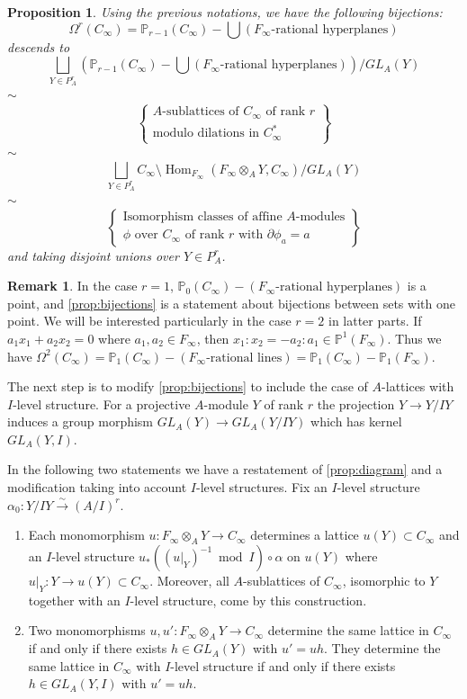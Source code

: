 \documentclass[12pt,a4paper]{article}
\theoremstyle{plain}
\newtheorem{proposition}{Proposition}[section]
\theoremstyle{definition}
\newtheorem{remark}{Remark}[section]
\theoremstyle{remark}
\DeclareMathOperator{\Hom}{Hom}
\newcommand{\bP}{\mathbb{P}}
\providecommand{\Hom}{\operatorname{Hom}}
\begin{document}
\begin{proposition}
\label{prop:bijections}
Using the previous notations, we have the following bijections:
\[
\Omega^r(C_\infty) = \bP_{r-1}(C_\infty) - \bigcup (F_\infty\text{-rational hyperplanes})
\]
descends to
\[
\bigsqcup_{Y \in P_A^r} (\bP_{r-1}(C_\infty) - \bigcup (F_\infty\text{-rational hyperplanes}))/GL_A(Y)
\]
$\sim$
\[
\left\{\begin{array}{c}
A\text{-sublattices of } C_\infty \text{ of rank } r \\
\text{modulo dilations in } C_\infty^*
\end{array}\right\}
\]
$\sim$
\[
\bigsqcup_{Y \in P_A^r} C_\infty \setminus \Hom_{F_\infty}(F_\infty \otimes_A Y, C_\infty)/GL_A(Y)
\]
$\sim$
\[
\left\{\begin{array}{c}
\text{Isomorphism classes of affine } A\text{-modules} \\
\phi \text{ over } C_\infty \text{ of rank } r \text{ with } \partial \phi_a = a
\end{array}\right\}
\]
and taking disjoint unions over $Y \in P_A^r$.
\end{proposition}

\begin{remark}
\label{rem:r=1}
In the case $r = 1$, $\bP_0(C_\infty) - (F_\infty\text{-rational hyperplanes})$ is a point, and \eqref{prop:bijections} is a statement about bijections between sets with one point. We will be interested particularly in the case $r = 2$ in latter parts. If $a_1 x_1 + a_2 x_2 = 0$ where $a_1, a_2 \in F_\infty$, then $x_1 : x_2 = -a_2 : a_1 \in \bP^1(F_\infty)$. Thus we have $\Omega^2(C_\infty) = \bP_1(C_\infty) - (F_\infty\text{-rational lines}) = \bP_1(C_\infty) - \bP_1(F_\infty)$.
\end{remark}

The next step is to modify \eqref{prop:bijections} to include the case of $A$-lattices with $I$-level structure. For a projective $A$-module $Y$ of rank $r$ the projection $Y \to Y/IY$ induces a group morphism $GL_A(Y) \to GL_A(Y/IY)$ which has kernel $GL_A(Y, I)$.

In the following two statements we have a restatement of \eqref{prop:diagram} and a modification taking into account $I$-level structures. Fix an $I$-level structure $\alpha_0: Y/IY \xrightarrow{\sim} (A/I)^r$.

\begin{enumerate}[label=(\arabic*)]
\item Each monomorphism $u: F_\infty \otimes_A Y \to C_\infty$ determines a lattice $u(Y) \subset C_\infty$ and an $I$-level structure $u_*( (u|_Y)^{-1} \bmod I) \circ \alpha$ on $u(Y)$ where $u|_Y: Y \to u(Y) \subset C_\infty$. Moreover, all $A$-sublattices of $C_\infty$, isomorphic to $Y$ together with an $I$-level structure, come by this construction.
\item Two monomorphisms $u, u': F_\infty \otimes_A Y \to C_\infty$ determine the same lattice in $C_\infty$ if and only if there exists $h \in GL_A(Y)$ with $u' = uh$. They determine the same lattice in $C_\infty$ with $I$-level structure if and only if there exists $h \in GL_A(Y, I)$ with $u' = uh$.
\end{enumerate}
\end{document}
